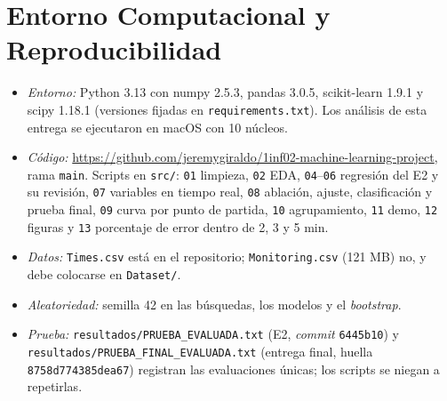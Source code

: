 \documentclass[conference,spanish]{IEEEtran}
\begin{document}
\section{Entorno Computacional y Reproducibilidad}
\begin{itemize}
    \item \emph{Entorno:} Python 3.13 con numpy 2.5.3, pandas 3.0.5, scikit-learn 1.9.1 y scipy 1.18.1 (versiones fijadas en \texttt{requirements.txt}). Los análisis de esta entrega se ejecutaron en macOS con 10 núcleos.
    \item \emph{Código:} \url{https://github.com/jeremygiraldo/1inf02-machine-learning-project}, rama \texttt{main}. Scripts en \texttt{src/}: \texttt{01} limpieza, \texttt{02} EDA, \texttt{04}--\texttt{06} regresión del E2 y su revisión, \texttt{07} variables en tiempo real, \texttt{08} ablación, ajuste, clasificación y prueba final, \texttt{09} curva por punto de partida, \texttt{10} agrupamiento, \texttt{11} demo, \texttt{12} figuras y \texttt{13} porcentaje de error dentro de 2, 3 y 5 min.
    \item \emph{Datos:} \texttt{Times.csv} está en el repositorio; \texttt{Monitoring.csv} (121 MB) no, y debe colocarse en \texttt{Dataset/}.
    \item \emph{Aleatoriedad:} semilla 42 en las búsquedas, los modelos y el \textit{bootstrap}.
    \item \emph{Prueba:} \texttt{resultados/PRUEBA\_EVALUADA.txt} (E2, \textit{commit} \texttt{6445b10}) y \texttt{resultados/PRUEBA\_FINAL\_EVALUADA.txt} (entrega final, huella \texttt{8758d774385dea67}) registran las evaluaciones únicas; los scripts se niegan a repetirlas.
\end{itemize}
\end{document}
